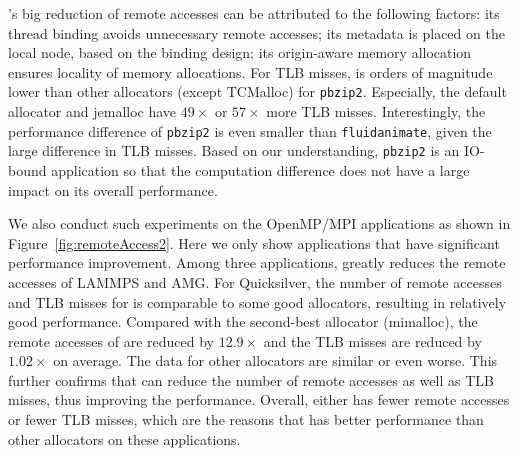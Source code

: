 \NM{}'s big reduction of remote accesses can be attributed to the following factors: its thread binding avoids unnecessary remote accesses; its metadata is placed on the local node, based on the binding design; its origin-aware memory allocation ensures locality of memory allocations.
For TLB misses, \NM{} is orders of magnitude lower than other allocators (except TCMalloc) for \texttt{pbzip2}. Especially, the default allocator and jemalloc have $49\times$ or $57\times$ more TLB misses. Interestingly, the performance difference of \texttt{pbzip2} is even smaller than \texttt{fluidanimate}, given the large difference in TLB misses. Based on our understanding, \texttt{pbzip2} is an IO-bound application so that the computation difference does not have a large impact on its overall performance. 



We also conduct such experiments on the OpenMP/MPI applications as shown in Figure~\ref{fig:remoteAccess2}. Here we only show applications that have significant performance improvement. Among three applications, \NM{} greatly reduces the remote accesses of LAMMPS and AMG. For Quicksilver, the number of remote accesses and TLB misses for \NM{} is comparable to some good allocators, resulting in relatively good performance. Compared with the second-best allocator (mimalloc), the remote accesses of \NM{} are
reduced by $12.9\times$ and the TLB misses are reduced by $1.02\times$ on average. The data for other allocators are similar
or even worse. This further confirms that \NM{} can reduce the number of remote accesses as well as TLB misses, thus improving the performance.
Overall, \NM{} either has fewer remote accesses or fewer TLB misses, which are the reasons that \NM{} has better performance than other allocators on these applications. 






